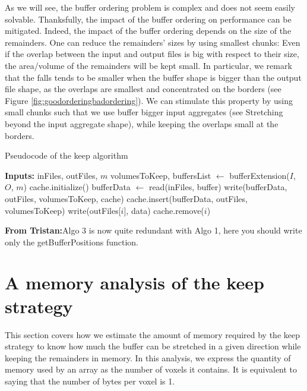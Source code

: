 \documentclass[conference]{IEEEtran}
\newcommand{\tristan}[1]{\color{orange}\textbf{From Tristan:}#1\color{black}}
\begin{document}
As we will see, the buffer ordering problem is complex and does not seem easily
solvable. Thanksfully, the impact of the buffer ordering on performance can be
mitigated. Indeed, the impact of the buffer ordering depends on the size of the
remainders. One can reduce the remainders' sizes by using smallest chunks: Even
if the overlap between the input and output files is big with respect to their
size, the area/volume of the remainders will be kept small. In particular, we
remark that the falls tends to be smaller when the buffer shape is bigger than
the output file shape, as the overlaps are smallest and concentrated on the
borders (see Figure \ref{fig:goodorderingbadordering}). We can stimulate this
property by using small chunks such that we use buffer bigger input aggregates
(see Stretching beyond the input aggregate shape), while keeping the overlaps
small at the borders.

\begin{algorithm}
  \caption{Pseudocode of the keep algorithm}
  \label{algo:keepalgorithm}
  \begin{algorithmic}
    \STATE \textbf{Inputs:} inFiles, outFiles, $m$
    \STATE volumesToKeep, buffersList $\leftarrow$ bufferExtension($I$, $O$, $m$)
    \STATE cache.initialize()
      \STATE bufferData $\leftarrow$ read(inFiles, buffer)
      \STATE write(bufferData, outFiles, volumesToKeep, cache)
      \STATE cache.insert(bufferData, outFiles, volumesToKeep)
          \STATE write(outFiles[$i$], data)
          \STATE cache.remove($i$)
        \ENDIF
      \ENDFOR
    \ENDFOR

  \end{algorithmic}
\end{algorithm}

\tristan{Algo 3 is now quite redundant with Algo 1, here you should write only the getBufferPositions function.}

\section{A memory analysis of the keep strategy}
This section covers how we estimate the amount of memory required by the keep
strategy to know how much the buffer can be stretched in a given direction while
keeping the remainders in memory. In this analysis, we express the quantity of
memory used by an array as the number of voxels it contains. It is equivalent
to saying that the number of bytes per voxel is 1.
\end{document}
